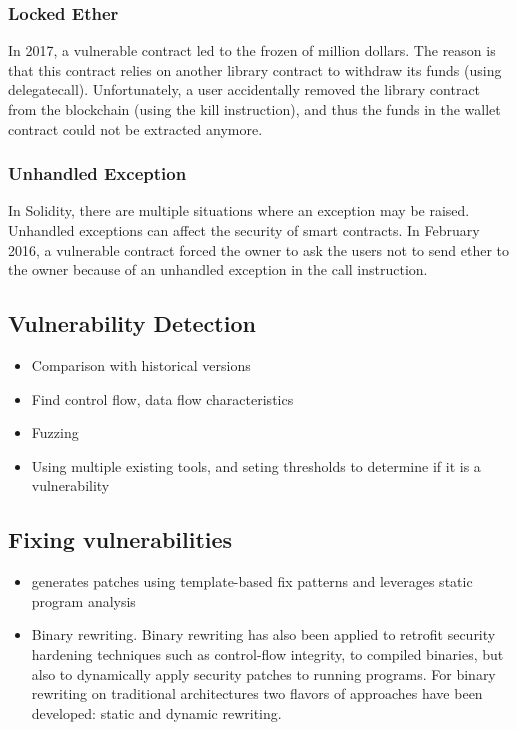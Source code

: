 \documentclass[a4paper, 10pt, conference, twocolumn]{ieeeconf}       %
\begin{document}
\subsubsection{Locked Ether}
In 2017, a vulnerable contract led to the frozen of million dollars. 
The reason is that this contract relies on another library contract to withdraw its funds (using delegatecall).
Unfortunately, a user accidentally removed the library contract from the blockchain (using the kill instruction), and thus the funds in the wallet contract could not be extracted anymore.

\subsubsection{Unhandled Exception}
In Solidity, there are multiple situations where an exception may be raised. Unhandled exceptions can affect the security of smart contracts. 
In February 2016, a vulnerable contract forced the owner to ask the users not to send ether to the owner because of an unhandled exception in the call instruction.

\subsection{Vulnerability Detection}

\begin{itemize}
    \item Comparison with historical versions
    \item Find control flow, data flow characteristics
    \item Fuzzing\cite{Huang2020EOSFuzzerFE}
    \item Using multiple existing tools, and seting thresholds to determine if it is a vulnerability
\end{itemize}

\subsection{Fixing vulnerabilities}

\begin{itemize}
    \item generates patches using template-based fix patterns and leverages static program analysis
    \item Binary rewriting.\cite{2020EVMPatch} Binary rewriting has also been applied to retrofit security hardening techniques such as control-flow integrity, to compiled binaries, but also to dynamically apply security patches to running programs. For binary rewriting on traditional architectures two flavors of approaches have been developed: static and dynamic rewriting.
\end{itemize}
\end{document}
